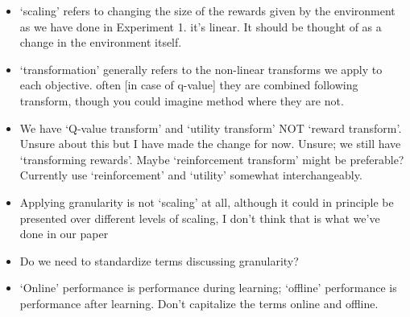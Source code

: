 \begin{itemize}
    \item `scaling' refers to changing the size of the rewards given by the environment as we have done in Experiment 1. it's linear. It should be thought of as a change in the environment itself.
    \item `transformation' generally refers to the non-linear transforms we apply to each objective. often [in case of q-value] they are combined following transform, though you could imagine method where they are not.
    \item We have `Q-value transform' and `utility transform' NOT `reward transform'. Unsure about this but I have made the change for now. Unsure; we still have `transforming rewards'. Maybe `reinforcement transform' might be preferable? Currently use `reinforcement' and `utility' somewhat interchangeably.
    \item Applying granularity is not `scaling' at all, although it could in principle be presented over different levels of scaling, I don't think that is what we've done in our paper
    \item Do we need to standardize terms discussing granularity?
    \item `Online' performance is performance during learning; `offline' performance is performance after learning. Don't capitalize the terms online and offline.
\end{itemize}

 
 
